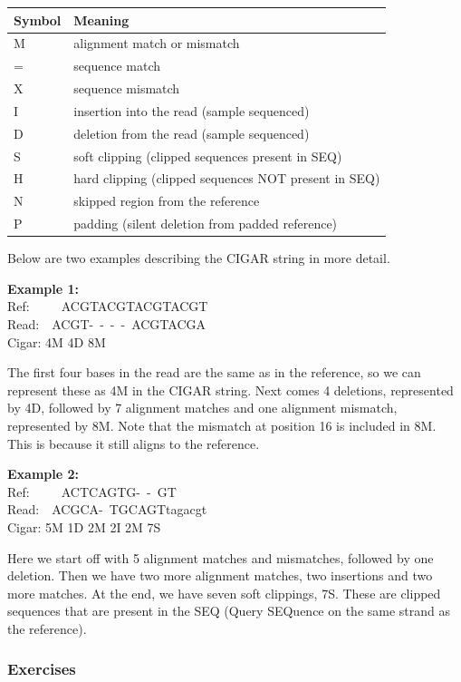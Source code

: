 \documentclass[11pt]{article}
\begin{document}
\begin{longtable}[]{@{}ll@{}}
\toprule
Symbol & Meaning \\
\midrule
\endhead
M & alignment match or mismatch \\
= & sequence match \\
X & sequence mismatch \\
I & insertion into the read (sample sequenced) \\
D & deletion from the read (sample sequenced) \\
S & soft clipping (clipped sequences present in SEQ) \\
H & hard clipping (clipped sequences NOT present in SEQ) \\
N & skipped region from the reference \\
P & padding (silent deletion from padded reference) \\
\bottomrule
\end{longtable}

Below are two examples describing the CIGAR string in more detail.

\textbf{Example 1:}\\
Ref:~~~~~ACGTACGTACGTACGT\\
Read:~~ACGT-~-~-~-~ACGTACGA\\
Cigar: 4M 4D 8M

The first four bases in the read are the same as in the reference, so we
can represent these as 4M in the CIGAR string. Next comes 4 deletions,
represented by 4D, followed by 7 alignment matches and one alignment
mismatch, represented by 8M. Note that the mismatch at position 16 is
included in 8M. This is because it still aligns to the reference.

\textbf{Example 2:}\\
Ref:~~~~~ACTCAGTG-~-~GT\\
Read:~~ACGCA-~TGCAGTtagacgt\\
Cigar: 5M 1D 2M 2I 2M 7S

Here we start off with 5 alignment matches and mismatches, followed by
one deletion. Then we have two more alignment matches, two insertions
and two more matches. At the end, we have seven soft clippings, 7S.
These are clipped sequences that are present in the SEQ (Query SEQuence
on the same strand as the reference).

\hypertarget{exercises}{%
\subsubsection{Exercises}\label{exercises}}
\end{document}
